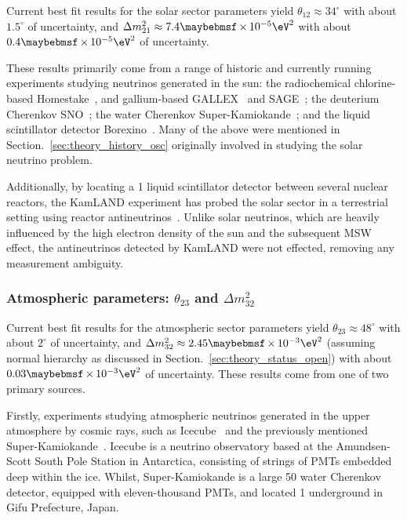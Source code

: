 Current best fit results for the solar sector parameters yield $\theta_{12}\approx34^{\circ}$ with
about $1.5^{\circ}$ of uncertainty, and $\Delta m^{2}_{21}\approx7.4\times10^{-5}\eV^{2}$ with
about $0.4\times10^{-5}\eV^{2}$ of uncertainty.

These results primarily come from a range of historic and currently running experiments studying
neutrinos generated in the sun: the radiochemical chlorine-based Homestake~\cite{cleveland1998},
and gallium-based GALLEX~\cite{kaether2010} and SAGE~\cite{abdurashitov2009}; the deuterium
Cherenkov SNO~\cite{maneira2011}; the water Cherenkov Super-Kamiokande~\cite{hosaka2006,
    cravens2008, abe2011_super, nakano2017}; and the liquid scintillator detector
Borexino~\cite{bellini2011, Bellini2010, bellini2014}. Many of the above were mentioned in
Section.~\ref{sec:theory_history_osc} originally involved in studying the solar neutrino problem.

Additionally, by locating a \unit{1}{} liquid scintillator detector between several
nuclear reactors, the KamLAND experiment has probed the solar sector in a terrestrial setting
using reactor antineutrinos~\cite{gando2011}. Unlike solar neutrinos, which are heavily influenced
by the high electron density of the sun and the subsequent MSW effect, the antineutrinos detected
by KamLAND were not effected, removing any measurement ambiguity.

\subsubsection*{Atmospheric parameters: $\theta_{23}$ and $\Delta m^{2}_{32}$} %

Current best fit results for the atmospheric sector parameters yield
$\theta_{23}\approx48^{\circ}$ with about $2^{\circ}$ of uncertainty, and $\Delta
    m^{2}_{32}\approx2.45\times10^{-3}\eV^{2}$ (assuming normal hierarchy as discussed in
Section.~\ref{sec:theory_status_open}) with about $0.03\times10^{-3}\eV^{2}$ of uncertainty. These
results come from one of two primary sources.

Firstly, experiments studying atmospheric neutrinos generated in the upper atmosphere by cosmic
rays, such as Icecube~\cite{aartsen2015} and the previously mentioned
Super-Kamiokande~\cite{abe2018}. Icecube is a neutrino observatory based at the Amundsen-Scott
South Pole Station in Antarctica, consisting of strings of PMTs embedded deep within the ice.
Whilst, Super-Kamiokande is a large \unit{50}{} water Cherenkov detector, equipped with
eleven-thousand PMTs, and located \unit{1}{} underground in
Gifu Prefecture, Japan.

